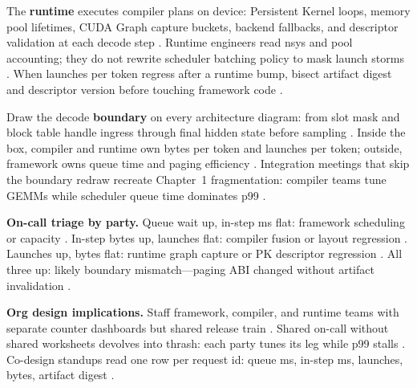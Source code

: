 The \textbf{runtime} executes compiler plans on device: Persistent Kernel loops, memory pool lifetimes, CUDA Graph capture buckets, backend fallbacks, and descriptor validation at each decode step \citep{yirage2026,nvidia2024cudagraphs,memoryfloor2026,taxbreak2026,patel2025llminference,chen2020compilerbasedhardw,kwon2023vllm,dlbook}. Runtime engineers read nsys and pool accounting; they do not rewrite scheduler batching policy to mask launch storms \citep{taxbreak2026,yirage2026,chen2020compilerbasedhardw,patel2025llminference,kwon2023vllm,dlbook}. When launches per token regress after a runtime bump, bisect artifact digest and descriptor version before touching framework code \citep{yirage2026,chen2020compilerbasedhardw,patel2025llminference,taxbreak2026,memoryfloor2026,dlbook}.

Draw the decode \textbf{boundary} on every architecture diagram: from slot mask and block table handle ingress through final hidden state before sampling \citep{kwon2023vllm,yirage2026,chen2020compilerbasedhardw,patel2025llminference,dao2022flashattention,dlbook}. Inside the box, compiler and runtime own bytes per token and launches per token; outside, framework owns queue time and paging efficiency \citep{patel2025llminference,taxbreak2026,memoryfloor2026,yirage2026,chen2020compilerbasedhardw,kwon2023vllm,dlbook}. Integration meetings that skip the boundary redraw recreate Chapter~1 fragmentation: compiler teams tune GEMMs while scheduler queue time dominates p99 \citep{patel2025llminference,memoryfloor2026,yirage2026,chen2020compilerbasedhardw,dlbook}.

\textbf{On-call triage by party.} Queue wait up, in-step ms flat: framework scheduling or capacity \citep{patel2025llminference,kwon2023vllm,dlbook}. In-step bytes up, launches flat: compiler fusion or layout regression \citep{memoryfloor2026,yirage2026,chen2020compilerbasedhardw,patel2025llminference,dlbook}. Launches up, bytes flat: runtime graph capture or PK descriptor regression \citep{taxbreak2026,nvidia2024cudagraphs,yirage2026,chen2020compilerbasedhardw,patel2025llminference,dlbook}. All three up: likely boundary mismatch---paging ABI changed without artifact invalidation \citep{kwon2023vllm,yirage2026,chen2020compilerbasedhardw,patel2025llminference,memoryfloor2026,taxbreak2026,dlbook}.

\textbf{Org design implications.} Staff framework, compiler, and runtime teams with separate counter dashboards but shared release train \citep{patel2025llminference,yirage2026,chen2020compilerbasedhardw,kwon2023vllm,taxbreak2026,memoryfloor2026,dlbook}. Shared on-call without shared worksheets devolves into thrash: each party tunes its leg while p99 stalls \citep{patel2025llminference,yirage2026,chen2020compilerbasedhardw,dlbook}. Co-design standups read one row per request id: queue ms, in-step ms, launches, bytes, artifact digest \citep{taxbreak2026,memoryfloor2026,patel2025llminference,yirage2026,chen2020compilerbasedhardw,kwon2023vllm,dlbook}.

